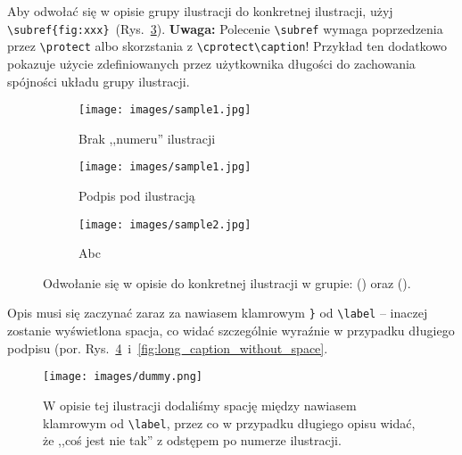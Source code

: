 \documentclass[pdftex,11pt,a4paper]{article}
\begin{document}
Aby odwołać się w opisie grupy ilustracji do konkretnej ilustracji, użyj \lstinline|\subref{fig:xxx}|~(Rys.~\ref{fig:subrefs}). \textbf{Uwaga:} Polecenie \lstinline|\subref| wymaga poprzedzenia przez \lstinline|\protect| albo skorzstania z \lstinline|\cprotect\caption|!
Przykład ten dodatkowo pokazuje użycie zdefiniowanych przez użytkownika długości do zachowania spójności układu grupy ilustracji.

\begin{figure}[H]
	\setlength{\picwidth}{0.3\groupwidth}
	\setlength{\subfigshsep}{0.05\linewidth}

	\centering

	\begin{subfigure}[c]{\picwidth}
		\centering
		\texttt{[image: images/sample1.jpg]}
		\caption*{Brak ,,numeru'' ilustracji}
	\end{subfigure}

	\vspace{\subfigsvsepdef}

	\begin{subfigure}[c]{\picwidth}
		\centering
		\texttt{[image: images/sample1.jpg]}
		\caption{Podpis pod ilustracją}
		\label{fig:sampleX_sub1}
	\end{subfigure}
	\hspace{\subfigshsep}
	\begin{subfigure}[c]{\picwidth}
		\centering
		\texttt{[image: images/sample2.jpg]}
		\caption{Abc}
		\label{fig:sampleX_sub2}
	\end{subfigure}
	
	\cprotect\caption{\label{fig:subrefs} Odwołanie się w opisie do konkretnej ilustracji w grupie: () oraz (\protect{}).}
\end{figure}


Opis musi się zaczynać zaraz za nawiasem klamrowym \verb|}| od \lstinline|\label| -- inaczej zostanie wyświetlona spacja, co widać szczególnie wyraźnie w przypadku długiego podpisu (por. Rys.~\ref{fig:long_caption_with_space}~i~\ref{fig:long_caption_without_space}.

\begin{figure}[H]
	\centering
	\texttt{[image: images/dummy.png]}
	\cprotect\caption{\label{fig:long_caption_with_space} W opisie tej ilustracji dodaliśmy spację między nawiasem klamrowym od \verb|\label|, przez co w przypadku długiego opisu widać, że ,,coś jest nie tak'' z odstępem po numerze ilustracji.}
\end{figure}
\end{document}
